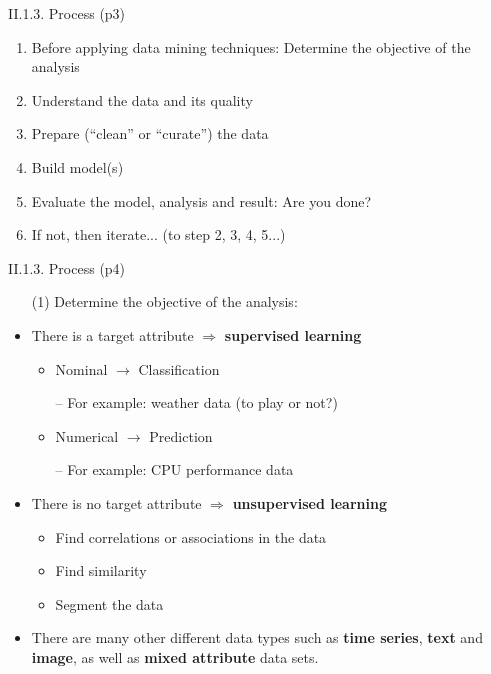 \documentclass[handout]{beamer}
\newcommand{\strong}[1]{\textbf{\color{teal} #1}}
\newcommand{\stronger}[1]{\textbf{\color{purple} #1}}
\begin{document}
\begin{frame}{II.1.3. Process (p3)}
\begin{enumerate}
\item Before applying data mining techniques: Determine the objective of the analysis
\item Understand the data and its quality
\item Prepare (``clean'' or ``curate'') the data
\item Build model(s)
\item Evaluate the model, analysis and result: Are you done?
\item If not, then iterate... (to step 2, 3, 4, 5...)
\end{enumerate}
\end{frame}
\begin{frame}{II.1.3. Process (p4)} 
\begin{itemize}
\item[] (1) Determine the objective of the analysis:
\item[]
\item There is a target attribute $\Rightarrow$ \stronger{supervised learning}
	\begin{itemize}
	\item Nominal $\rightarrow$ Classification 
	\item[--] For example: weather data (to play or not?)
	\item Numerical $\rightarrow$ Prediction
	\item[--] For example: CPU performance data
	\end{itemize}
\item There is no target attribute $\Rightarrow$ \stronger{unsupervised learning}
	\begin{itemize}
	\item Find correlations or associations in the data
	\item Find similarity
	\item Segment the data
	\end{itemize}
\item[]
\item There are many other different data types such as \strong{time series}, \strong{text} and \strong{image}, as well as \strong{mixed attribute} data sets.
\end{itemize}
\end{frame}
\end{document}

